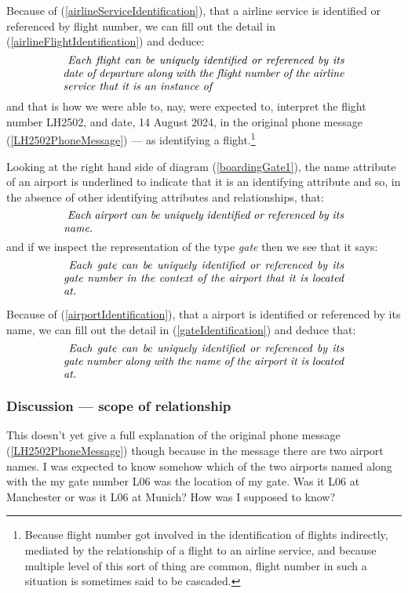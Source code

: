 \mynote
Because of (\ref{airlineServiceIdentification}), that a airline service is identified or referenced by flight number,  we can fill out the detail in (\ref{airlineFlightIdentification}) and deduce:
\begin{equation}
\label{airlineFlightNetIdentification}
\text{\parbox{9cm}{\textit{
Each flight can be uniquely identified or referenced by its date of departure along with the flight number of the airline service that it is an instance of}}}
\end{equation}
and that is how we were able to, nay, were expected to, interpret the flight number LH2502, 
and date, 14 August 2024, in the original phone message (\ref{LH2502PhoneMessage}) --- as identifying a flight.\footnote{Because flight number got involved in the identification of flights indirectly, 
 mediated by the  relationship of a flight to an airline service, 
 and because multiple level of this sort of thing are common, flight number in such a situation is sometimes said to be cascaded.}

\mynote
Looking at the right hand side of diagram (\ref{boardingGate1}),
the name attribute of an airport is underlined to indicate that
it is an identifying attribute and so, in the absence of other identifying attributes and relationships,
that:
\begin{equation}
\label{airportIdentification}
\text{\parbox{9cm}{\textit{
Each airport can be uniquely identified or referenced by its name.}}}
\end{equation}
and if we inspect the representation of the type \textit{gate} then we see that it says:
\begin{equation}
\label{gateIdentification}
\text{\parbox{9cm}{\textit{
Each gate can be uniquely identified or referenced by its gate number in the context of the airport that it is located at.}}}
\end{equation}

\mynote
Because of (\ref{airportIdentification}), that a airport is identified or referenced by its name,  we can fill out the detail in (\ref{gateIdentification}) and deduce that:
\begin{equation}
\label{gateNetIdentification}
\text{\parbox{9cm}{\textit{
Each gate can be uniquely identified or referenced by its gate number along with the name of the airport it is located at.}}}
\end{equation}
\subsubsection{Discussion --- scope of relationship}
This doesn't yet give a full explanation of the original phone message 
(\ref{LH2502PhoneMessage}) though because
in the message there are two airport names. 
I was expected to know somehow which of the two airports named along with the my gate number L06
was the location of my gate.  Was it L06 at Manchester or was it L06 at Munich? How was I supposed to know? 

